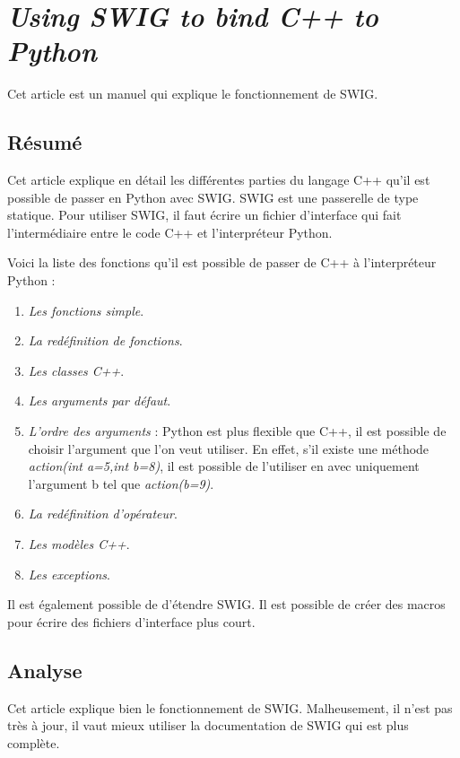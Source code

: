 \documentclass[11pt, french, screen]{report-rd-info}
\begin{document}
\section{\emph{Using SWIG to bind C++ to Python}}

Cet article \cite{2003USTBCTPTeresa} est un manuel qui explique le fonctionnement de SWIG.

\subsection{Résumé}

Cet article explique en détail les différentes parties du langage C++ qu'il est possible de passer en Python avec SWIG. SWIG est une passerelle de type statique. Pour utiliser SWIG, il faut écrire un fichier d'interface qui fait l'intermédiaire entre le code C++ et l'interpréteur Python.

Voici la liste des fonctions qu'il est possible de passer de C++ à l'interpréteur Python :
\begin{enumerate}
\item \emph{Les fonctions simple}.
\item \emph{La redéfinition de fonctions}.
\item \emph{Les classes C++}.
\item \emph{Les arguments par défaut}.
\item \emph{L'ordre des arguments} : Python est plus flexible que C++, il est possible de choisir l'argument que l'on veut utiliser. En effet, s'il existe une méthode \emph{action(int a=5,int b=8)}, il est possible de l'utiliser en avec uniquement l'argument b tel que \emph{action(b=9)}.
\item \emph{La redéfinition d'opérateur}.
\item \emph{Les modèles C++}.
\item \emph{Les exceptions}.
\end{enumerate}

Il est également possible de d'étendre SWIG. Il est possible de créer des macros pour écrire des fichiers d'interface plus court.

\subsection{Analyse}

Cet article explique bien le fonctionnement de SWIG. Malheusement, il n'est pas très à jour, il vaut mieux utiliser la documentation de SWIG qui est plus complète.
\end{document}
